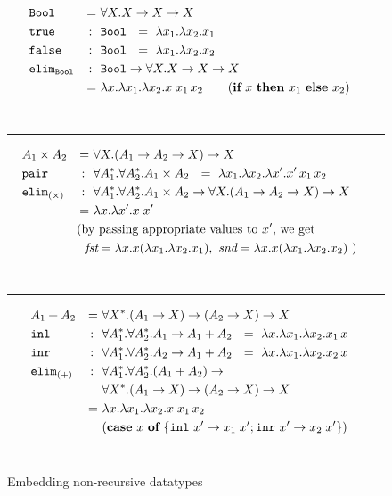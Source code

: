 \begin{figure}
\begin{align*}
&\!\!\!\!\!\!\mathtt{Bool} &=~& \forall X.X -> X -> X \\
&\!\!\!\!\!\!\mathtt{true}  &\!\!\!:~~& \texttt{Bool} ~~=~ \l x_1.\l x_2. x_1 \\
&\!\!\!\!\!\!\mathtt{false} &\!\!\!:~~& \texttt{Bool} ~~=~ \l x_1.\l x_2. x_2 \\
&\!\!\!\!\!\!\mathtt{elim_{Bool}} &\!\!\!:~~& \texttt{Bool} -> \forall X.X -> X -> X \\
&	&=~& \l x.\l x_1. \l x_2. x\;x_1\,x_2 \qquad
(\textbf{if}~x~\textbf{then}~x_1~\textbf{else}~x_2)
\end{align*}\vspace*{-19pt} \\ \vspace*{-4pt}
\rule{\linewidth}{.4pt}
\begin{align*}
&\!\!\!\!\!\!A_1\times A_2 &=~& \forall X. (A_1 -> A_2 -> X) -> X \\
&\!\!\!\!\!\!\mathtt{pair} &\!\!\!:~~&
	\forall A_1^{*}.\forall A_2^{*}.A_1\times A_2
	~~=~ \l x_1.\l x_2.\l x'.x'\,x_1\,x_2 \\
&\!\!\!\!\!\!\mathtt{elim_{(\times)}} &\!\!\!:~~&
	\forall A_1^{*}.\forall A_2^{*}.A_1\times A_2 ->
	\forall X. (A_1 -> A_2 -> X) -> X \\
	& &=~& \l x.\l x'.x\;x' \\
 &&&\!\!\!\!\!\!\!\!\text{(by passing appropriate values to $x'$, we get}\\
 &&&\!\!\!\!\textit{fst} = \l x.x(\l x_1.\l x_2.x_1),~
            \textit{snd} = \l x.x(\l x_1.\l x_2.x_2) ~)
\end{align*} \vspace*{-19pt} \\ \vspace*{-4pt}
\rule{\linewidth}{.4pt}
\begin{align*}
&\!\!\!\!\!\!A_1+A_2 &=~&\forall X^{*}. (A_1 -> X) -> (A_2 -> X) -> X \\
&\!\!\!\!\!\!\mathtt{inl} &\!\!\!:~~& \forall A_1^{*}.\forall A_2^{*}.A_1-> A_1+A_2
	~~=~ \l x. \l x_1. \l x_2 . x_1\,x \\
&\!\!\!\!\!\!\mathtt{inr} &\!\!\!:~~& \forall A_1^{*}.\forall A_2^{*}.A_2-> A_1+A_2
	~~=~ \l x. \l x_1. \l x_2 . x_2\,x \\
&\!\!\!\!\!\!\mathtt{elim_{(+)}} &\!\!\!:~~&
	\forall A_1^{*}.\forall A_2^{*}.(A_1+A_2) -> \\
	&&& \forall X^{*}. (A_1 -> X) -> (A_2 -> X) -> X \\
	& &=~& \l x.\l x_1. \l x_2. x\;x_1\,x_2 \\
	&&&			(\textbf{case}~x~\textbf{of}~
				\{\mathtt{inl}~x' -> x_1\;x';
				  \mathtt{inr}~x' -> x_2\;x'\})
\end{align*}~\vspace*{-10pt}
\caption{Embedding non-recursive datatypes}
\label{fig:churchnonrec}
\end{figure}
